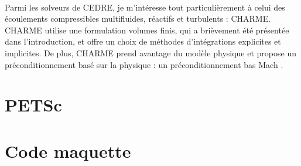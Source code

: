   \paragraph{}
  Parmi les solveurs de CEDRE, je m'intéresse tout particulièrement à celui des écoulements compressibles multifluides, réactifs et turbulents : CHARME.
  CHARME utilise une formulation volumes finis, qui a brièvement été présentée dans l'introduction, et offre un choix de méthodes d'intégrations explicites et implicites.
  De plus, CHARME prend avantage du modèle physique et propose un préconditionnement basé sur la physique : un préconditionnement bas Mach \cite{Turkel1987}.


\section{PETSc}


\section{Code maquette}
